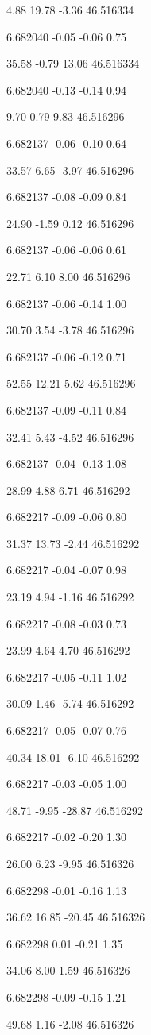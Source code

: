 4.88
19.78
-3.36
46.516334

6.682040
-0.05
-0.06
0.75

35.58
-0.79
13.06
46.516334

6.682040
-0.13
-0.14
0.94

9.70
0.79
9.83
46.516296

6.682137
-0.06
-0.10
0.64

33.57
6.65
-3.97
46.516296

6.682137
-0.08
-0.09
0.84

24.90
-1.59
0.12
46.516296

6.682137
-0.06
-0.06
0.61

22.71
6.10
8.00
46.516296

6.682137
-0.06
-0.14
1.00

30.70
3.54
-3.78
46.516296

6.682137
-0.06
-0.12
0.71

52.55
12.21
5.62
46.516296

6.682137
-0.09
-0.11
0.84

32.41
5.43
-4.52
46.516296

6.682137
-0.04
-0.13
1.08

28.99
4.88
6.71
46.516292

6.682217
-0.09
-0.06
0.80

31.37
13.73
-2.44
46.516292

6.682217
-0.04
-0.07
0.98

23.19
4.94
-1.16
46.516292

6.682217
-0.08
-0.03
0.73

23.99
4.64
4.70
46.516292

6.682217
-0.05
-0.11
1.02

30.09
1.46
-5.74
46.516292

6.682217
-0.05
-0.07
0.76

40.34
18.01
-6.10
46.516292

6.682217
-0.03
-0.05
1.00

48.71
-9.95
-28.87
46.516292

6.682217
-0.02
-0.20
1.30

26.00
6.23
-9.95
46.516326

6.682298
-0.01
-0.16
1.13

36.62
16.85
-20.45
46.516326

6.682298
0.01
-0.21
1.35

34.06
8.00
1.59
46.516326

6.682298
-0.09
-0.15
1.21

49.68
1.16
-2.08
46.516326

